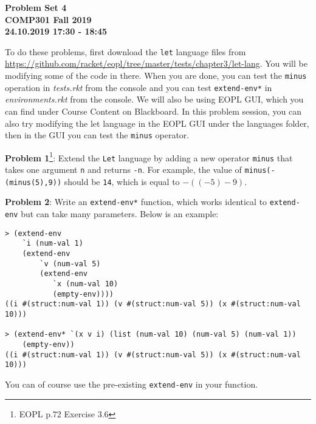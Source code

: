 \documentclass[12pt,reqno]{amsart}
\newcommand{\code}[1]{\texttt{#1}}
\begin{document}
\begin{center}
\large\textbf{Problem Set 4 \\ COMP301 Fall 2019} \\
\normalsize\textbf{24.10.2019 17:30 - 18:45} \\
\end{center}

\vspace{7.5mm}

To do these problems, first download the \code{let} language files from \url{https://github.com/racket/eopl/tree/master/tests/chapter3/let-lang}. You will be modifying some of the code in there. When you are done, you can test the \code{minus} operation in \textit{tests.rkt} from the console and you can test \code{extend-env*} in \textit{environments.rkt} from the console. We will also be using EOPL GUI, which you can find under Course Content on Blackboard. In this problem session, you can also try modifying the let language in the EOPL GUI under the languages folder, then in the GUI you can test the \code{minus} operator.

\vspace{7.5mm}

\textbf{Problem 1}\footnote{EOPL p.72 Exercise 3.6}: Extend the \code{Let} language by adding a new operator \code{minus} that takes one argument \code{n} and returns \code{-n}. For
example, the value of \code{minus(-(minus(5),9))} should be \code{14}, which is equal to $-((-5)-9)$.

\vspace{7.5mm}

\textbf{Problem 2}: Write an \code{extend-env*} function, which works identical to \code{extend-env} but can take many parameters. Below is an example:
\begin{lstlisting}
> (extend-env
    `i (num-val 1)
    (extend-env
        `v (num-val 5)
        (extend-env
           `x (num-val 10)
           (empty-env))))
((i #(struct:num-val 1)) (v #(struct:num-val 5)) (x #(struct:num-val 10)))
         
> (extend-env* `(x v i) (list (num-val 10) (num-val 5) (num-val 1)) 
    (empty-env))
((i #(struct:num-val 1)) (v #(struct:num-val 5)) (x #(struct:num-val 10)))
\end{lstlisting}
You can of course use the pre-existing \code{extend-env} in your function.
\end{document}
